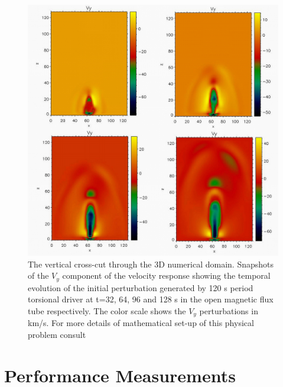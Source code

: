 
\begin{figure}[]
\includegraphics[scale=1.0]{figure7_fluxtube.jpg}
\caption{The vertical cross-cut through the 3D numerical domain. Snapshots of the $V_{y}$ component of the velocity  response showing the temporal evolution of the initial  perturbation  generated by 120 s period torsional driver  at t=32, 64, 96 and 128 s  in the open magnetic flux tube respectively. The color scale shows the $V_{y}$ perturbations in km/s. For more details of mathematical set-up of this physical problem consult  \citep{Fedun et al. 2011}}
\end{figure}



\section{Performance Measurements}

